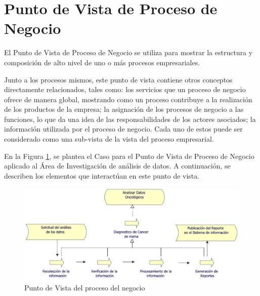 \newpage
\section{Punto de Vista de Proceso de Negocio}
El Punto de Vista de Proceso de Negocio se utiliza para mostrar la estructura y composición de alto nivel de uno o más procesos empresariales\cite{BolanosCastro2019}.

Junto a los procesos mismos, este punto de vista contiene otros conceptos directamente relacionados, tales como: los servicios que un proceso de negocio ofrece de manera global, mostrando como un proceso contribuye a la realización de los productos de la empresa; la asignación de los procesos de negocio a las funciones, lo que da una idea de las responsabilidades de los actores asociados; la información utilizada por el proceso de negocio. Cada uno de estos puede ser considerado como una sub-vista de la vista del proceso empresarial\cite{BolanosCastro2019}.

En la Figura \ref{PvProceso}, se plantea el Caso para el Punto de Vista de Proceso de Negocio aplicado al Área de Investigación de análisis de datos. A continuación, se describen los elementos que interactúan en este punto de vista.

\begin{figure}[h!]
	\centering
	\includegraphics[width=1\linewidth]{ARQUITECTURA/imgs/CapaNegocio/4_PvProceso}
	\caption{Punto de Vista del proceso del negocio}
	\label{PvProceso}
\end{figure}

